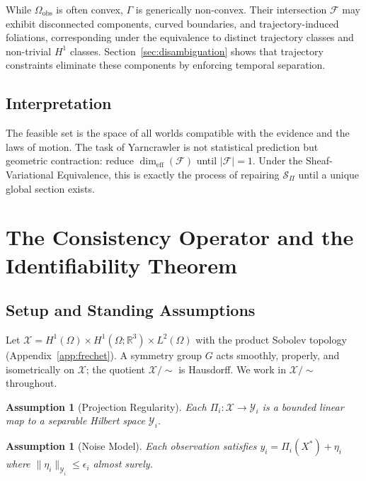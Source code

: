 \documentclass[12pt, oneside]{article}
\newtheorem{assumption}[theorem]{Assumption}
\newcommand{\Xmod}{\mathcal{X}/{\sim}}
\begin{document}
While $\Omega_{\mathrm{obs}}$ is often convex, $\Gamma$ is generically non-convex.
Their intersection $\mathcal{F}$ may exhibit disconnected components, curved boundaries,
and trajectory-induced foliations, corresponding under the equivalence to distinct
trajectory classes and non-trivial $H^1$ classes. Section~\ref{sec:disambiguation}
shows that trajectory constraints eliminate these components by enforcing temporal
separation.

\subsection{Interpretation}

The feasible set is the space of all worlds compatible with the evidence and the laws of
motion. The task of Yarncrawler is not statistical prediction but geometric contraction:
reduce $\dim_{\mathrm{eff}}(\mathcal{F})$ until $|\mathcal{F}| = 1$. Under the
Sheaf-Variational Equivalence, this is exactly the process of repairing $\mathcal{S}_\Pi$
until a unique global section exists.

\section{The Consistency Operator and the Identifiability Theorem}
\label{sec:identifiability}

\subsection{Setup and Standing Assumptions}

Let $\mathcal{X} = H^1(\Omega) \times H^1(\Omega;\mathbb{R}^3) \times L^2(\Omega)$
with the product Sobolev topology (Appendix~\ref{app:frechet}). A symmetry group $G$
acts smoothly, properly, and isometrically on $\mathcal{X}$; the quotient $\Xmod$ is
Hausdorff. We work in $\Xmod$ throughout.

\begin{assumption}[Projection Regularity]
\label{ass:regularity}
Each $\Pi_i : \mathcal{X} \to \mathcal{Y}_i$ is a bounded linear map to a separable
Hilbert space $\mathcal{Y}_i$.
\end{assumption}

\begin{assumption}[Noise Model]
\label{ass:noise}
Each observation satisfies $y_i = \Pi_i(X^*) + \eta_i$ where $\|\eta_i\|_{\mathcal{Y}_i}
\le \epsilon_i$ almost surely.
\end{assumption}
\end{document}
